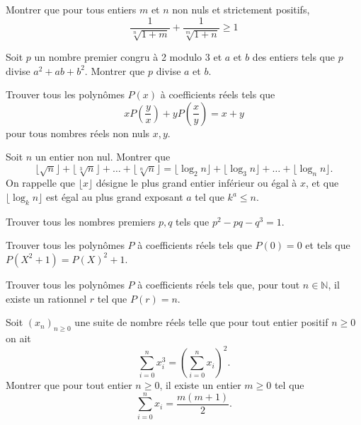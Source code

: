 \begin{exo}{}
Montrer que pour tous entiers $m$ et $n$ non nuls et strictement positifs,
\[\frac{1}{\sqrt[n]{1+m}}+\frac{1}{\sqrt[m]{1+n}}\geq 1\]
\end{exo}

\begin{exo}{}
 Soit $p$ un nombre premier congru à 2 modulo 3 et $a$ et $b$ des entiers tels que $p$ divise $a^2 + ab + b^2$. Montrer que $p$ divise $a$ et $b$.\end{exo}


\begin{exo}{}
Trouver tous les polynômes $P(x)$ à coefficients réels tels que 
$$x P \left( \frac{y}{x} \right)+y P \left( \frac{x}{y} \right)=x+y$$
pour tous nombres réels non nuls $x,y$.
\end{exo}

\begin{exo}{}
Soit $n$ un entier non nul. Montrer que \[ \lfloor \sqrt{n} \rfloor + \lfloor \sqrt[3]{n} \rfloor + \ldots + \lfloor \sqrt[n]{n} \rfloor = \lfloor \log_2 n \rfloor + \lfloor \log_3 n \rfloor + \ldots + \lfloor \log_n n \rfloor.\]
On rappelle que $\lfloor x \rfloor$ désigne le plus grand entier inférieur ou égal à $x$, et que $\lfloor \log_k n \rfloor$ est égal au plus grand exposant $a$ tel que $k^a \leq n$.
\end{exo}


\begin{exo}{}
Trouver tous les nombres premiers $p,q$ tels que $ p^2-pq-q^3=1 $.
\end{exo}

\begin{exo}{} Trouver tous les polynômes $P$ à coefficients réels tels que $P(0)=0$ et tels que $P(X^{2}+1)=P(X)^{2}+1$.
\end{exo}

\begin{exo}{}Trouver tous les polynômes $P$ à coefficients réels tels que, pour tout $n \in \mathbb{N}$, il existe un rationnel $r$ tel que $P(r)=n$.
\end{exo}

\begin{exo}{}Soit $(x_{n})_{n \geq 0}$ une suite de nombre réels telle que pour tout entier positif $n \geq 0$ on ait
$$ \sum_{i=0}^{n}x_{i}^{3}= \left( \sum_{i=0}^{n}x_{i} \right) ^{2}.$$
Montrer que pour tout entier $n \geq 0$, il existe un entier $m \geq 0$ tel que
$$ \sum_{i=0}^{n}x_{i}= \frac{m(m+1)}{2}.$$
\end{exo}

